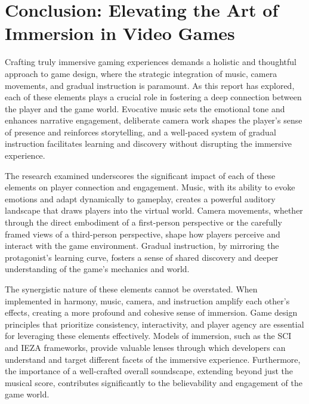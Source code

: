 \documentclass{article}
\begin{document}
    \section{Conclusion: Elevating the Art of Immersion in Video Games}

    Crafting truly immersive gaming experiences demands a holistic and thoughtful approach to game design, where the strategic integration of music, camera movements, and gradual instruction is paramount. As this report has explored, each of these elements plays a crucial role in fostering a deep connection between the player and the game world. Evocative music sets the emotional tone and enhances narrative engagement, deliberate camera work shapes the player's sense of presence and reinforces storytelling, and a well-paced system of gradual instruction facilitates learning and discovery without disrupting the immersive experience.

    The research examined underscores the significant impact of each of these elements on player connection and engagement. Music, with its ability to evoke emotions and adapt dynamically to gameplay, creates a powerful auditory landscape that draws players into the virtual world. Camera movements, whether through the direct embodiment of a first-person perspective or the carefully framed views of a third-person perspective, shape how players perceive and interact with the game environment. Gradual instruction, by mirroring the protagonist's learning curve, fosters a sense of shared discovery and deeper understanding of the game's mechanics and world.

    The synergistic nature of these elements cannot be overstated. When implemented in harmony, music, camera, and instruction amplify each other's effects, creating a more profound and cohesive sense of immersion. Game design principles that prioritize consistency, interactivity, and player agency are essential for leveraging these elements effectively. Models of immersion, such as the SCI and IEZA frameworks, provide valuable lenses through which developers can understand and target different facets of the immersive experience. Furthermore, the importance of a well-crafted overall soundscape, extending beyond just the musical score, contributes significantly to the believability and engagement of the game world.
 
\end{document}
